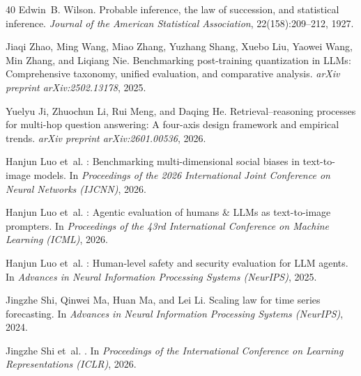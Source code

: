 \documentclass{article}
\begin{document}
\begin{thebibliography}{40}
Edwin~B. Wilson.
\newblock Probable inference, the law of succession, and statistical inference.
\newblock \emph{Journal of the American Statistical Association}, 22(158):209--212, 1927.

Jiaqi Zhao, Ming Wang, Miao Zhang, Yuzhang Shang, Xuebo Liu, Yaowei Wang, Min Zhang, and Liqiang Nie.
\newblock Benchmarking post-training quantization in {LLM}s: Comprehensive taxonomy, unified evaluation, and comparative analysis.
\newblock \emph{arXiv preprint arXiv:2502.13178}, 2025.


Yuelyu Ji, Zhuochun Li, Rui Meng, and Daqing He.
\newblock Retrieval--reasoning processes for multi-hop question answering: A four-axis design framework and empirical trends.
\newblock \emph{arXiv preprint arXiv:2601.00536}, 2026.

Hanjun Luo et~al.
: Benchmarking multi-dimensional social biases in text-to-image models.
\newblock In \emph{Proceedings of the 2026 International Joint Conference on Neural Networks (IJCNN)}, 2026.

Hanjun Luo et~al.
: Agentic evaluation of humans \& {LLM}s as text-to-image prompters.
\newblock In \emph{Proceedings of the 43rd International Conference on Machine Learning (ICML)}, 2026.

Hanjun Luo et~al.
: Human-level safety and security evaluation for {LLM} agents.
\newblock In \emph{Advances in Neural Information Processing Systems (NeurIPS)}, 2025.

Jingzhe Shi, Qinwei Ma, Huan Ma, and Lei Li.
\newblock Scaling law for time series forecasting.
\newblock In \emph{Advances in Neural Information Processing Systems (NeurIPS)}, 2024.

Jingzhe Shi et~al.
.
\newblock In \emph{Proceedings of the International Conference on Learning Representations (ICLR)}, 2026.

\end{thebibliography}
\end{document}
